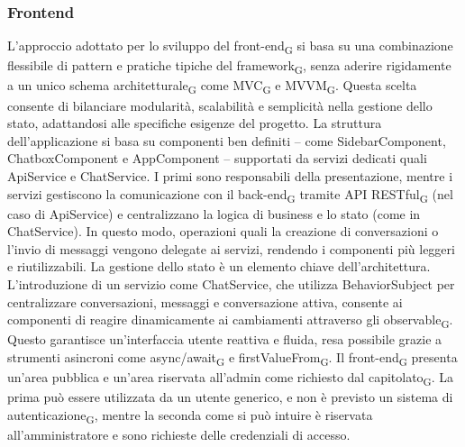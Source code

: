 \subsubsection{Frontend}
L'approccio adottato per lo sviluppo del front-end\textsubscript{G} si basa su una combinazione flessibile di pattern e pratiche tipiche del framework\textsubscript{G}, senza aderire rigidamente a un unico schema architetturale\textsubscript{G} come MVC\textsubscript{G} e MVVM\textsubscript{G}. Questa scelta consente di bilanciare modularità, scalabilità e semplicità nella gestione dello stato, adattandosi alle specifiche esigenze del progetto. La struttura dell'applicazione si basa su componenti ben definiti – come SidebarComponent, ChatboxComponent e AppComponent – supportati da servizi dedicati quali ApiService e ChatService. I primi sono responsabili della presentazione, mentre i servizi gestiscono la comunicazione con il back-end\textsubscript{G} tramite API RESTful\textsubscript{G} (nel caso di ApiService) e centralizzano la logica di business e lo stato (come in ChatService). In questo modo, operazioni quali la creazione di conversazioni o l’invio di messaggi vengono delegate ai servizi, rendendo i componenti più leggeri e riutilizzabili. La gestione dello stato è un elemento chiave dell'architettura. L'introduzione di un servizio come ChatService, che utilizza BehaviorSubject per centralizzare conversazioni, messaggi e conversazione attiva, consente ai componenti di reagire dinamicamente ai cambiamenti attraverso gli observable\textsubscript{G}. Questo garantisce un'interfaccia utente reattiva e fluida, resa possibile grazie a strumenti asincroni come async/await\textsubscript{G} e firstValueFrom\textsubscript{G}.
Il front-end\textsubscript{G} presenta un’area pubblica e un’area riservata all’admin come richiesto dal capitolato\textsubscript{G}. La prima può essere utilizzata da un utente generico, e non è previsto un sistema di autenticazione\textsubscript{G}, mentre la seconda come si può intuire è riservata all’amministratore e sono richieste delle credenziali di accesso.
